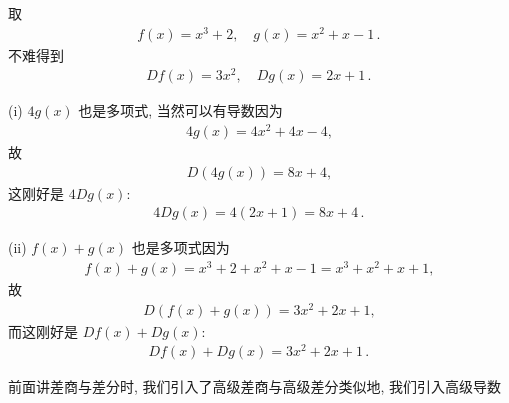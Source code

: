 \begin{example}
    取
    \begin{align*}
        f(x) = x^3 + 2, \quad g(x) = x^2 + x - 1 \period
    \end{align*}
    不难得到
    \begin{align*}
        Df (x) = 3x^2, \quad Dg (x) = 2x + 1 \period
    \end{align*}

    (i) $4g(x)$ 也是多项式, 当然可以有导数\period 因为
    \begin{align*}
        4g(x) = 4x^2 + 4x - 4,
    \end{align*}
    故
    \begin{align*}
        D(4g(x)) = 8x + 4,
    \end{align*}
    这刚好是 $4Dg(x)$:
    \begin{align*}
        4Dg(x) = 4(2x + 1) = 8x + 4 \period
    \end{align*}

    (ii) $f(x) + g(x)$ 也是多项式\period 因为
    \begin{align*}
        f(x) + g(x) = x^3 + 2 + x^2 + x - 1 = x^3 + x^2 + x + 1,
    \end{align*}
    故
    \begin{align*}
        D(f(x) + g(x)) = 3x^2 + 2x + 1,
    \end{align*}
    而这刚好是 $Df(x) + Dg(x)$:
    \begin{align*}
        Df(x) + Dg(x) = 3x^2 + 2x + 1 \period
    \end{align*}
\end{example}

前面讲差商与差分时, 我们引入了高级差商与高级差分\period 类似地, 我们引入高级导数\period

